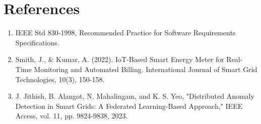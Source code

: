\section{References}
\begin{enumerate}[leftmargin=*]
  \item IEEE Std 830-1998, Recommended Practice for Software Requirements Specifications.  
  \item Smith, J., \& Kumar, A. (2022). IoT-Based Smart Energy Meter for Real-Time Monitoring and Automated Billing. International Journal of Smart Grid Technologies, 10(3), 150-158.  
  \item J. Jithish, B. Alangot, N. Mahalingam, and K. S. Yeo, "Distributed Anomaly Detection in Smart Grids: A Federated Learning-Based Approach," IEEE Access, vol. 11, pp. 9824-9838, 2023.  
\end{enumerate}